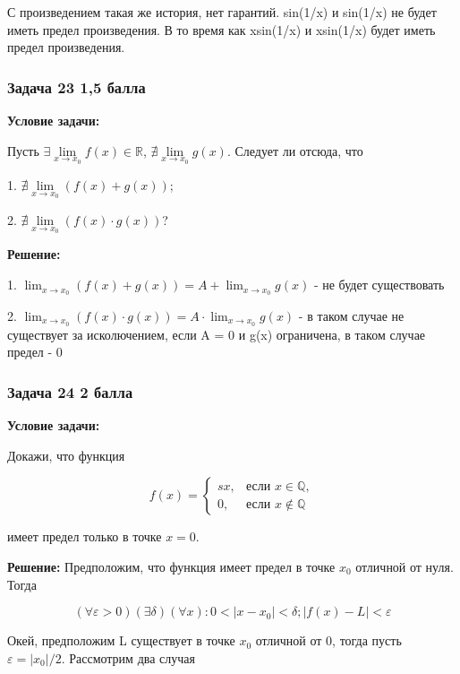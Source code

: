 \documentclass[a4paper,12pt]{article}
\begin{document}
С произведением такая же история, нет гарантий. sin(1/x) и sin(1/x) не будет иметь предел произведения. В то время как xsin(1/x) и xsin(1/x) будет иметь предел произведения.

\vspace{1cm}

\subsubsection{Задача 23 \hfill 1,5 балла}

\textbf{Условие задачи:}

Пусть $\exists \lim\limits_{x \to x_0} f(x) \in \mathbb{R}$, $\nexists \lim\limits_{x \to x_0} g(x)$. Следует ли отсюда, что

1. $\nexists \lim\limits_{x \to x_0} (f(x) + g(x))$;

2. $\nexists \lim\limits_{x \to x_0} (f(x) \cdot g(x))$?

\textbf{Решение: }

1. $\lim_{x \to x_0}(f(x) + g(x)) = A + \lim_{x \to x_0} g(x)$ - не будет существовать

2. $\lim_{x \to x_0}(f(x)\cdot g(x)) = A\cdot \lim_{x \to x_0} g(x)$ - в таком случае не существует за исколючением, если A = 0 и g(x) ограничена, в таком случае предел - 0

\vspace{1cm}

\subsubsection{Задача 24 \hfill 2 балла}

\textbf{Условие задачи:}

Докажи, что функция

\[ f(x) = 
  \begin{cases} s
   x, & \text{если } x \in \mathbb{Q}, \\
   0, & \text{если } x \notin \mathbb{Q}
  \end{cases}
\]

имеет предел только в точке $x = 0$.

\textbf{Решение: }
Предположим, что функция имеет предел в точке $x_0$ отличной от нуля. Тогда

\[
(\forall \varepsilon > 0) (\exists \delta) (\forall x): 0 < |x-x_0| < \delta; |f(x) - L| < \varepsilon
\]

Окей, предположим L существует в точке $x_0$ отличной от 0, тогда пусть $\varepsilon = |x_0|/2$. Рассмотрим два случая
\end{document}
